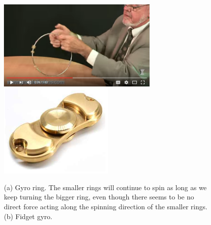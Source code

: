 \begin{figure}[th]
\caption{(a) Gyro ring. The smaller rings will continue to spin as long as
we keep turning the bigger ring, even though there seems to be no direct
force acting along the spinning direction of the smaller rings. (b) Fidget
gyro.}
\begin{center}
\includegraphics[width=0.7\textwidth]{./figs/gyro_ring.png} %
\includegraphics[width=0.5\textwidth]{./figs/fidget_gyro.png}
\end{center}
\label{gyro_fidget_rings}
\end{figure}

\bigskip

